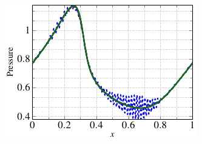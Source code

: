 \begin{figure}
\begin{subfigure}[]{0.47\linewidth}
\end{subfigure} 
\begin{subfigure}[]{0.47\linewidth}
        \includegraphics[scale=1]{Figures/paper-figure18.pdf}

\end{subfigure}
\end{figure}
